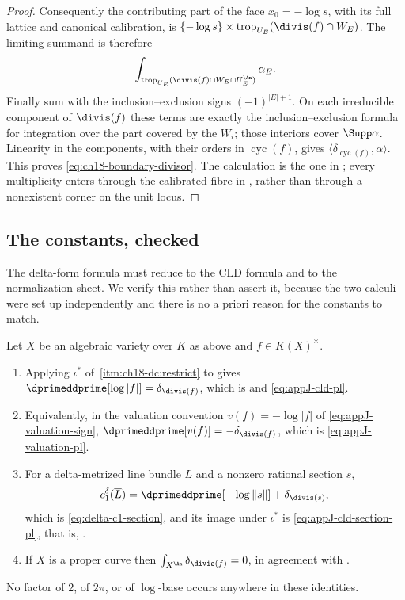 \begin{proof}
Consequently the contributing part of the face $x_0=-\log s$, with its
full lattice and canonical calibration, is
$
 \{-\log s\}\times
 \operatorname{trop}_{U_E}(\divis(f)\cap W_E)
$.
The limiting summand is therefore
\[
        \int_{\operatorname{trop}_{U_E}
          (\divis(f)\cap W_E\cap U_E^{\An})}\alpha_E .
\]
Finally sum with the inclusion--exclusion signs
$(-1)^{|E|+1}$.  On each irreducible component of $\divis(f)$ these terms
are exactly the inclusion--exclusion formula for integration over the part
covered by the $W_i$; those interiors cover $\Supp\alpha$.  Linearity in the
components, with their orders in $\operatorname{cyc}(f)$, gives
$\langle\delta_{\operatorname{cyc}(f)},\alpha\rangle$.  This proves
\eqref{eq:ch18-boundary-divisor}.  The calculation is the one in
\cite[Theorem~7.2 and Lemma~7.3]{GK17}; every multiplicity enters through
the calibrated fibre in , rather than through
a nonexistent corner on the unit locus.
\end{proof}

\subsection{The constants, checked}
\label{sec:ch18-pl-constants}

The delta-form formula must reduce to the CLD formula and to the normalization
sheet.  We verify this rather than assert it, because the two calculi were
set up independently and there is no a priori reason for the constants to
match.

\begin{corollary}
\label{cor:ch18-pl-restricts}
Let $X$ be an algebraic variety over $K$ as above and $f\in K(X)^\times$.
\begin{enumerate}
\item\label{itm:ch18-plc:cld}
 Applying $\iota^\ast$ of
 \,\cref{itm:ch18-dc:restrict} to
  gives
 $\dprimeddprime[\log|f|]=\delta_{\divis(f)}$, which is
  and \eqref{eq:appJ-cld-pl}.
\item\label{itm:ch18-plc:val}
 Equivalently, in the valuation convention
 $v(f)=-\log|f|$ of \eqref{eq:appJ-valuation-sign},
 $\dprimeddprime[v(f)]=-\delta_{\divis(f)}$, which is
 \eqref{eq:appJ-valuation-pl}.
\item\label{itm:ch18-plc:section}
 For a delta-metrized line bundle $\overline L$ and a nonzero rational
 section $s$,
 \[
  c_1^\delta(\overline L)
  =\dprimeddprime[-\log\|s\|]+\delta_{\divis(s)},
 \]
 which is \eqref{eq:delta-c1-section}, and its image under $\iota^\ast$ is
 \eqref{eq:appJ-cld-section-pl}, that is, .
\item\label{itm:ch18-plc:mass}
 If $X$ is a proper curve then $\int_{X^{\An}}\delta_{\divis(f)}=0$, in
 agreement with .
\end{enumerate}
No factor of $2$, of $2\pi$, or of $\log$-base occurs anywhere in these
identities.
\end{corollary}

